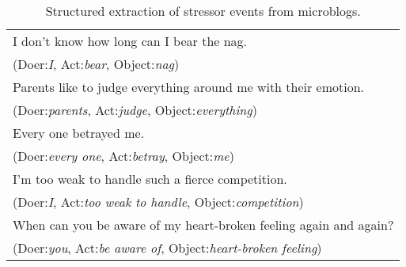 \linespread{1.1}
\begin{table}[H]
\begin{center}
\caption{\small{Structured extraction of stressor events from microblogs.}}
\small{
\begin{tabular}{l} \hline \rowcolor{gray!40}
I don't know how long can I bear the nag.\\ \rowcolor{gray!40}
(Doer:\emph{I}, Act:\emph{bear}, Object:\emph{nag})\\ %
Parents like to judge everything around me with their emotion.
\\(Doer:\emph{parents}, Act:\emph{judge}, Object:\emph{everything})\\ \rowcolor{gray!40}
Every one betrayed me. \\ \rowcolor{gray!40}
(Doer:\emph{every one}, Act:\emph{betray}, Object:\emph{me})\\ \hline
I'm too weak to handle such a fierce competition.\\ %
(Doer:\emph{I}, Act:\emph{too weak to handle}, Object:\emph{competition})\\ \rowcolor{gray!40}
When can you be aware of my heart-broken feeling again and again?\\ \rowcolor{gray!40}
(Doer:\emph{you}, Act:\emph{be aware of}, Object:\emph{heart-broken feeling})\\ \hline
\end{tabular}
}
\label{tab:stressors}
\end{center}
\end{table}